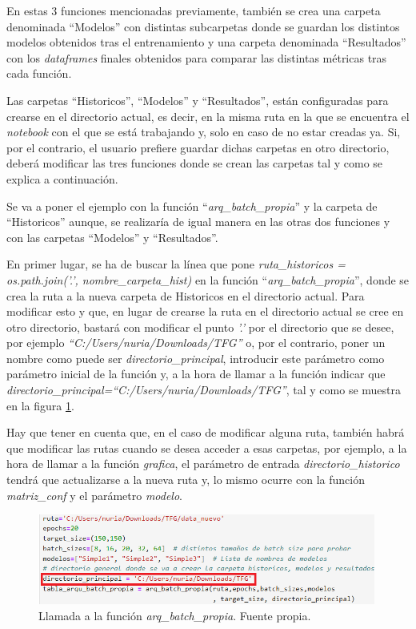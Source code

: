 En estas 3 funciones mencionadas previamente, también se crea una carpeta denominada ``Modelos'' con distintas subcarpetas donde se guardan los distintos modelos obtenidos tras el entrenamiento y una carpeta denominada ``Resultados'' con los \textit{dataframes} finales obtenidos para comparar las distintas métricas tras cada función. 

Las carpetas ``Historicos'', ``Modelos'' y ``Resultados'', están configuradas para crearse en el directorio actual, es decir, en la misma ruta en la que se encuentra el \textit{notebook} con el que se está trabajando y, solo en caso de no estar creadas ya. Si, por el contrario, el usuario prefiere guardar dichas carpetas en otro directorio, deberá modificar las tres funciones donde se crean las carpetas tal y como se explica a continuación.

Se va a poner el ejemplo con la función ``\textit{arq\_batch\_propia}'' y la carpeta de ``Historicos'' aunque, se realizaría de igual manera en las otras dos funciones y con las carpetas ``Modelos'' y ``Resultados''. 

En primer lugar, se ha de buscar la línea que pone \textit{ruta\_historicos = os.path.join('.', nombre\_carpeta\_hist)} en la función ``\textit{arq\_batch\_propia}'', donde se crea la ruta a la nueva carpeta de Historicos en el directorio actual. Para modificar esto y que, en lugar de crearse la ruta en el directorio actual se cree en otro directorio, bastará con modificar el punto \textit{'.'} por el directorio que se desee, por ejemplo \textit{``C:/Users/nuria/Downloads/TFG''} o, por el contrario, poner un nombre como puede ser \textit{directorio\_principal}, introducir este parámetro como parámetro inicial de la función y, a la hora de llamar a la función indicar que  \textit{directorio\_principal=``C:/Users/nuria/Downloads/TFG''}, tal y como se muestra en la figura \ref{fig:directorio_modelos_hist_result}. 

Hay que tener en cuenta que, en el caso de modificar alguna ruta, también habrá que modificar las rutas cuando se desea acceder a esas carpetas, por ejemplo, a la hora de llamar a la función \textit{grafica}, el parámetro de entrada \textit{directorio\_historico} tendrá que actualizarse a la nueva ruta y, lo mismo ocurre con la función \textit{matriz\_conf} y el parámetro \textit{modelo}.

\begin{figure}[h]
    \centering
    \includegraphics[width=0.99\textwidth]{img/direct_model_hist_result.png}
    \caption{Llamada a la función \textit{arq\_batch\_propia}. Fuente propia.}
    \label{fig:directorio_modelos_hist_result}
\end{figure}
\FloatBarrier


